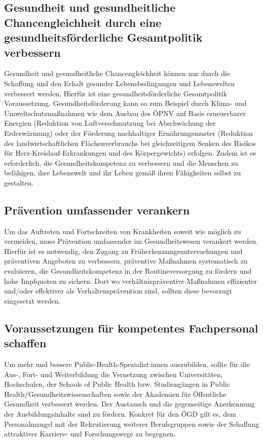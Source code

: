 \documentclass{article}
\begin{document}
\subsection{Gesundheit und gesundheitliche Chancengleichheit durch eine gesundheitsförderliche Gesamtpolitik verbessern}\label{H5259713}



Gesundheit und gesundheitliche Chancengleichheit können nur durch die Schaffung und den Erhalt gesunder Lebensbedingungen und Lebenswelten verbessert werden. Hierfür ist eine gesundheitsförderliche Gesamtpolitik Voraussetzung. Gesundheitsförderung kann so zum Beispiel durch Klima- und Umweltschutzmaßnahmen wie dem Ausbau des ÖPNV auf Basis erneuerbarer Energien (Reduktion von Luftverschmutzung bei Abschwächung der Erderwärmung) oder der Förderung nachhaltiger Ernährungsmuster (Reduktion des landwirtschaftlichen Flächenverbrauchs bei gleichzeitigem Senken des Risikos für Herz-Kreislauf-Erkrankungen und des Körpergewichts) erfolgen. Zudem ist es erforderlich, die Gesundheitskompetenz zu verbessern und die Menschen zu befähigen, ihre Lebenswelt und ihr Leben gemäß ihren Fähigkeiten selbst zu gestalten.


\subsection{Prävention umfassender verankern}\label{H6816661}



Um das Auftreten und Fortschreiten von Krankheiten soweit wie möglich zu vermeiden, muss Prävention umfassender im Gesundheitswesen verankert werden. Hierfür ist es notwendig, den Zugang zu Früherkennungsuntersuchungen und präventiven Angeboten zu verbessern, präventive Maßnahmen systematisch zu evaluieren, die Gesundheitskompetenz in der Routineversorgung zu fördern und hohe Impfquoten zu sichern. Dort wo verhältnispräventive Maßnahmen effizienter und/oder effektiver als Verhaltensprävention sind, sollten diese bevorzugt eingesetzt werden.


\subsection{Voraussetzungen für kompetentes Fachpersonal schaffen}\label{H3576125}



Um mehr und bessere Public-Health-Spezialist:innen auszubilden, sollte für die Aus-, Fort- und Weiterbildung die Vernetzung zwischen Universitäten, Hochschulen, der Schools of Public Health bzw. Studiengängen in Public Health/Gesundheitswissenschaften sowie der Akademien für Öffentliche Gesundheit verbessert werden. Der Austausch und die gegenseitige Anerkennung der Ausbildungsinhalte sind zu fördern. Konkret für den ÖGD gilt es, dem Personalmangel mit der Rekrutierung weiterer Berufsgruppen sowie der Schaffung attraktiver Karriere- und Forschungswege zu begegnen.
\end{document}
